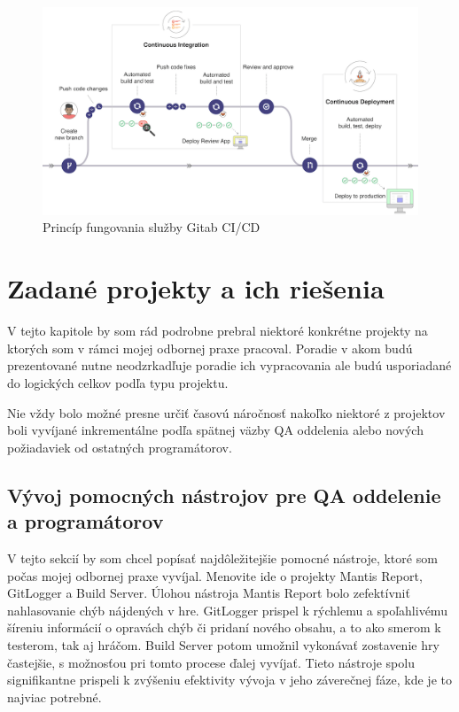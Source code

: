\documentclass[slovak, bachelorpractice]{diploma}
\begin{document}
\begin{figure}[!htbp]
	\centering
	\includegraphics[width=.9\textwidth]{Pictures/gitlab.png}
	\vspace{-15pt}
	\caption[Princíp fungovania služby Gitab CI/CD]{Princíp fungovania služby Gitab CI/CD \cite{Cicd}}
	\label{pic:Gitlab}
\end{figure}

\chapter{Zadané projekty a ich riešenia}
\label{sec:Projects}
V tejto kapitole by som rád podrobne prebral niektoré konkrétne projekty na ktorých som v rámci mojej odbornej praxe pracoval. Poradie v akom budú prezentované nutne neodzrkadľuje poradie ich vypracovania ale budú usporiadané do logických celkov podľa typu projektu. 

Nie vždy bolo možné presne určiť časovú náročnosť nakoľko niektoré z projektov boli vyvíjané inkrementálne podľa spätnej väzby QA oddelenia alebo nových požiadaviek od ostatných programátorov.

\section{Vývoj pomocných nástrojov pre QA oddelenie a programátorov}
\label{sec:QACode}
V tejto sekcií by som chcel popísať najdôležitejšie pomocné nástroje, ktoré som počas mojej odbornej praxe vyvíjal. Menovite ide o projekty Mantis Report, GitLogger a Build Server. Úlohou nástroja Mantis Report bolo zefektívniť nahlasovanie chýb nájdených v hre. GitLogger prispel k rýchlemu a spoľahlivému šíreniu informácií o opravách chýb či pridaní nového obsahu, a to ako smerom k testerom, tak aj hráčom. Build Server potom umožnil vykonávať zostavenie hry častejšie, s možnosťou pri tomto procese ďalej vyvíjať. Tieto nástroje spolu signifikantne prispeli k zvýšeniu efektivity vývoja v jeho záverečnej fáze, kde je to najviac potrebné.
\end{document}
